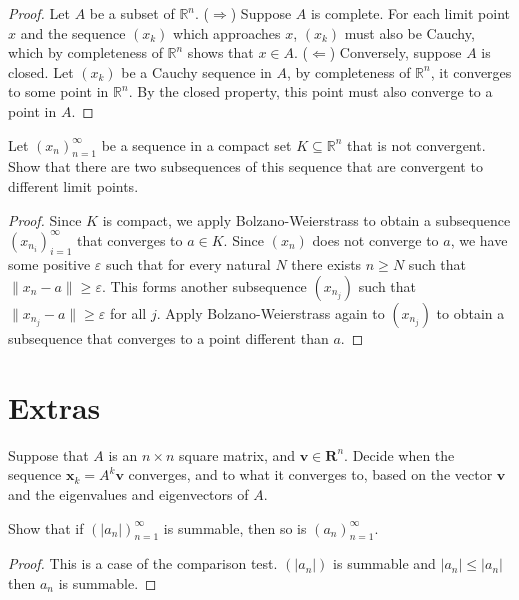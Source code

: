 \documentclass[../main.tex]{subfiles}
\begin{document}
\begin{proof}
    Let $A$ be a subset of $\mathbb{R}^n$.
    ($\Rightarrow$) Suppose $A$ is complete.
    For each limit point $x$ and the sequence $(x_k)$ which approaches $x$, $(x_k)$ must also be Cauchy, which by completeness of $\mathbb{R}^n$ shows that $x \in A$.
    ($\Leftarrow$) Conversely, suppose $A$ is closed.
    Let $(x_k)$ be a Cauchy sequence in $A$, by completeness of $\mathbb{R}^n$, it converges to some point in $\mathbb{R}^n$.
    By the closed property, this point must also converge to a point in $A$.
\end{proof}

\begin{problem}[\S4.4 F]
    Let $(x_n)_{n = 1}^\infty$ be a sequence in a compact set $K \subseteq \mathbb{R}^n$ that is not convergent.
    Show that there are two subsequences of this sequence that are convergent to different limit points.
\end{problem}
\begin{proof}
    Since $K$ is compact, we apply Bolzano-Weierstrass to obtain a subsequence $(x_{n_i})_{i = 1}^\infty$ that converges to $a \in K$.
    Since $(x_n)$ does not converge to $a$, we have some positive $\varepsilon$ such that for every natural $N$ there exists $n \ge N$ such that $\|x_n - a\| \ge \varepsilon$.
    This forms another subsequence $(x_{n_j})$ such that $\|x_{n_j} - a\| \ge \varepsilon$ for all $j$.
    Apply Bolzano-Weierstrass again to $(x_{n_j})$ to obtain a subsequence that converges to a point different than $a$.
\end{proof}


\section{Extras}
\begin{problem}
    Suppose that $A$ is an $n \times n$ square matrix, and $\mathbf{v} \in \mathbf{R}^n$.
    Decide when the sequence $\mathbf{x}_k = A^k\mathbf{v}$ converges, and to what it converges to, based on the vector $\mathbf{v}$ and the eigenvalues and eigenvectors of $A$.
\end{problem}

Show that if $(|a_n|)_{n=1}^\infty$ is summable, then so is $(a_n)_{n=1}^\infty$.
\begin{proof}
    This is a case of the comparison test.
    $(|a_n|)$ is summable and $|a_n| \le |a_n|$ then $a_n$ is summable.
\end{proof}
\end{document}
